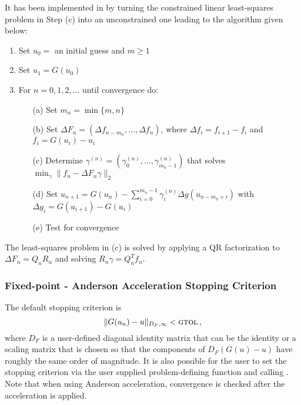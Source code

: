It has been implemented in {\kinsol} by turning the constrained linear least-squares problem in Step (c) into an unconstrained one leading to the algorithm given below:

\vspace{1ex}
\begin{enumerate}
   \item Set $u_0 = $ an initial guess and $m \ge 1$
   \item Set $u_1 = G(u_0)$ 
   \item For $n = 0, 1, 2,...$ until convergence do:
      \begin{itemize}
          \item[(a)] Set $m_n = \min\{m,n\}$
          \item[(b)] Set $\Delta F_{n} = (\Delta f_{n-m_n}, \ldots, \Delta f_n)$, where $\Delta f_i = f_{i+1} - f_i$ and $f_i=G(u_i)-u_i$
          \item[(c)] Determine $\gamma^{(n)} = (\gamma_0^{(n)}, \ldots, \gamma_{m_n-1}^{(n)})$ that solves 
	$\min_\gamma  \| f_n - \Delta F_n \gamma \|_2$ 
          \item[(d)] Set $u_{n+1} = G(u_n)-\sum_{i=0}^{m_n-1} \gamma_i^{(n)} \Delta g(u_{n-m_k+i})$ with $\Delta g_i = G(u_{i+1}) - G(u_i)$
          \item[(e)] Test for convergence
      \end{itemize}
\end{enumerate}

The least-squares problem in (c) is solved by applying a QR factorization to $\Delta F_n = Q_n R_n$ and solving $R_n \gamma = Q_n^T f_n$.


\subsubsection*{Fixed-point - Anderson Acceleration Stopping Criterion}

The default stopping criterion is 
\[ \|G(u_n) - u\|_{D_F,\infty} < \mbox{\sc gtol} \, , \]
where $D_F$ is a user-defined diagonal identity matrix that can be the identity 
or a scaling matrix that is chosen so that the components of $D_F (G(u)-u)$ have 
roughly the same order of magnitude.
It is also possible for the user to set the stopping criterion via the user 
supplied problem-defining function and calling .  
Note that when using Anderson acceleration, 
convergence is checked after the acceleration is applied.



